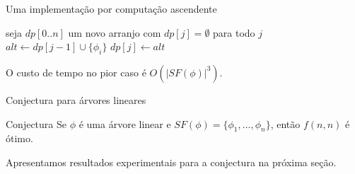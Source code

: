 \begin{frame}{Uma implementação por computação ascendente}
	\begin{algorithmic}[1]
		\STATE seja $dp[0..n]$ um novo arranjo com $dp[j] = \emptyset$ para todo $j$
				\STATE $alt \gets dp[j-1] \cup \{\phi_i\}$
					\STATE $dp[j] \gets alt$
				\ENDIF
			\ENDFOR
		\ENDFOR
	\end{algorithmic}
	
	\pause O custo de tempo no pior caso é $O(|SF(\phi)|^3)$.
\end{frame}

\begin{frame}{Conjectura para árvores lineares}
	\begin{block}{Conjectura}
		Se $\phi$ é uma árvore linear e $SF(\phi) = \{\phi_1,...,\phi_n \}$, então $f(n,n)$ é ótimo.
	\end{block}
	
	\pause Apresentamos resultados experimentais para a conjectura na próxima seção.
\end{frame}
